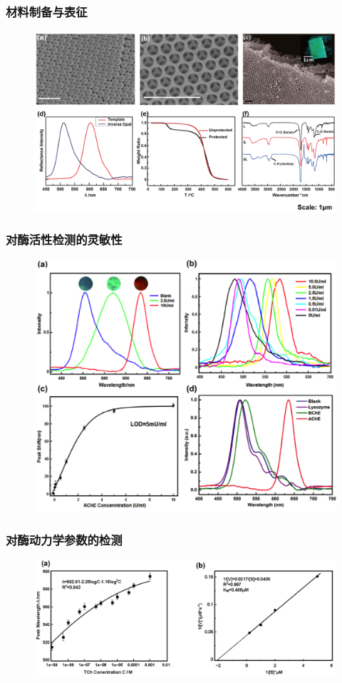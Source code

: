 \documentclass{beamer}
\begin{document}
\begin{frame}
  \frametitle{材料制备与表征}
  \begin{figure}[htbp]
    \centering
    \includegraphics[width=\linewidth]{figures/ch2-chara.png}
  \end{figure}
\end{frame}


\begin{frame}
  \frametitle{对酶活性检测的灵敏性}
  \begin{figure}[htbp]
    \centering
    \includegraphics[height=0.60\linewidth]{figures/enzyme_sensitivity.png}
  \end{figure}
\end{frame}

\begin{frame}
  \frametitle{对酶动力学参数的检测}
  \begin{figure}[htbp]
    \centering
    \includegraphics[width=\linewidth]{figures/kinetics.png}
  \end{figure}
\end{frame}
\end{document}
